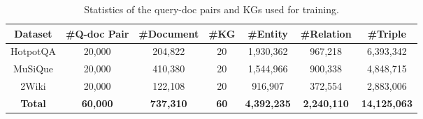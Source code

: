 \begin{table}[h]
    \centering
    \caption{Statistics of the query-doc pairs and KGs used for training.}
    \label{tab:training_data}
        \begin{tabular}{@{}ccccccc@{}}
            \toprule
            Dataset & \#Q-doc Pair & \#Document & \#KG & \#Entity & \#Relation & \#Triple  \\ \midrule
            HotpotQA & 20,000        & 204,822    & 20    & 1,930,362  & 967,218     & 6,393,342  \\
            MuSiQue  & 20,000        & 410,380    & 20    & 1,544,966  & 900,338     & 4,848,715  \\
            2Wiki    & 20,000        & 122,108    & 20    & 916,907    & 372,554     & 2,883,006  \\
            \midrule
            \textbf{Total} & \textbf{60,000} & \textbf{737,310} & \textbf{60} & \textbf{4,392,235} & \textbf{2,240,110} & \textbf{14,125,063} \\ \bottomrule
        \end{tabular}%
\end{table}